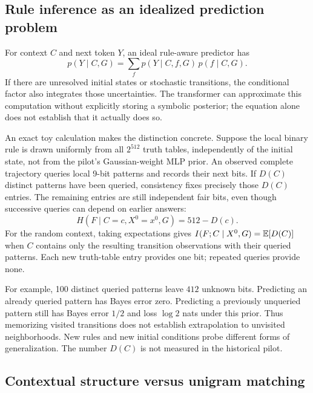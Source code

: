 \subsection{Rule inference as an idealized prediction problem}

For context $C$ and next token $Y$, an ideal rule-aware predictor has
\begin{equation}
 p(Y\mid C,G)=
     \sum_f p(Y\mid C,f,G)\,p(f\mid C,G).
 \label{eq:posteriorpredictive}
\end{equation}
If there are unresolved initial states or stochastic transitions, the
conditional factor also integrates those uncertainties.
The transformer can approximate this computation without explicitly
storing a symbolic posterior; the equation alone does not establish that
it actually does so.

An exact toy calculation makes the distinction concrete. Suppose the
local binary rule is drawn uniformly from all $2^{512}$ truth tables,
independently of the initial state,
not from the pilot's Gaussian-weight MLP prior. An observed complete
trajectory queries local 9-bit patterns and records their next bits.
If $D(C)$ distinct patterns have been queried, consistency fixes precisely
those $D(C)$ entries. The remaining entries are still independent fair
bits, even though successive queries can depend on earlier answers:
\begin{equation}
 H(F\mid C=c,X^0=x^0,G)=512-D(c).
 \label{eq:truthposterior}
\end{equation}
For the random context, taking expectations gives
$I(F;C\mid X^0,G)=\mathbb{E}[D(C)]$ when $C$ contains only the resulting transition
observations with their queried patterns. Each new truth-table entry
provides one bit; repeated queries provide none.

For example, 100 distinct queried patterns leave $412$ unknown bits.
Predicting an already queried pattern has Bayes error zero. Predicting
a previously unqueried pattern still has Bayes error $1/2$ and loss
$\log2$ nats under this prior. Thus memorizing visited transitions does
not establish extrapolation to unvisited neighborhoods. New rules and
new initial conditions probe different forms of generalization.
The number $D(C)$ is not measured in the historical pilot.

\subsection{Contextual structure versus unigram matching}

